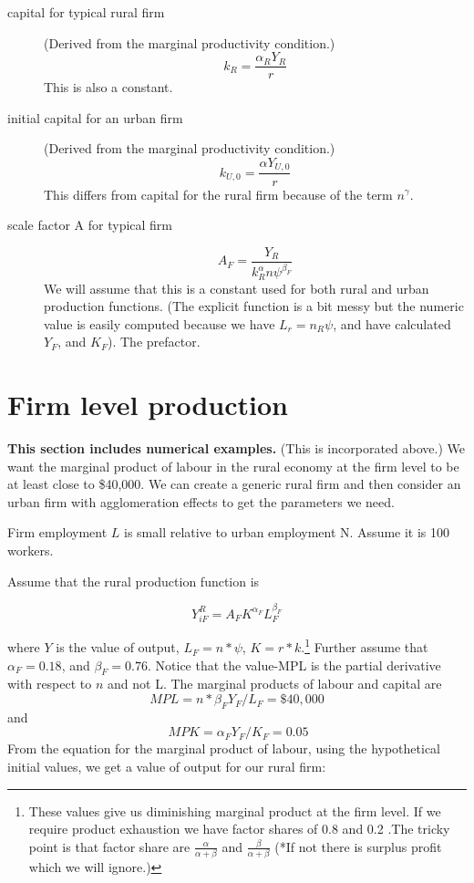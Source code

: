\begin{description}
\item[capital for typical rural firm] (Derived from the marginal productivity condition.)
\[k_R=  \frac{\alpha_R Y_R }{r}\]
This is also a constant.
 
\item[initial capital for an urban firm] (Derived from the marginal productivity condition.)
\[k_{U,0}=  \frac{\alpha Y_{U,0} }{r}\]
This differs from capital  for the rural firm because of the term $n^\gamma$. 

\item[scale factor A for typical  firm] 
\[A_F= \frac{Y_R}{k_R^{\alpha} {n\psi}^{\beta_F}}\]
We will assume that this is a constant used for both rural and urban production functions. (The explicit function is a bit  messy but the numeric value is easily computed because we have $L_r=n_R\psi$, and have calculated $Y_F$, and  $K_F$). The prefactor.

\end{description}


\section{Firm level production}  
 \textbf{This section includes numerical examples.%
 }
(This is incorporated above.) We want the marginal product of labour in the rural economy at the firm level to be at least close to \$40,000.  We can create a generic rural firm and then consider an urban firm with agglomeration effects to get the parameters we need. 

Firm employment $L$ is small relative to  urban employment {N}. Assume it is 100 workers. 

Assume that the rural production function is 

\[ Y_{iF}^R=A_{F} K^{\alpha_F} L_F^{\beta_F} \]

where $Y$ is the value of output, $L_F=n*\psi$, $K=r*k$.\footnote{These values give us diminishing marginal product at the firm level. If we require product exhaustion we have factor shares of  0.8 and 0.2 .The tricky point is that factor share are 
 $\frac{\alpha}{\alpha + \beta}$ and $\frac{\beta}{\alpha + \beta}$
(*If not there is surplus profit  which we will ignore.)}
Further assume that $\alpha_F=0.18 $,  and $\beta_F=0.76$. Notice that the value-MPL is the partial derivative with respect to $n$ and not L. 
The marginal products of labour and capital are 
\[MPL=n*\beta_F Y_F/L_F=\$40,000\] and\[\ MPK=\alpha_F Y_F/K_F =0.05\]
From the equation for the marginal product of labour, using the hypothetical initial values, we get a value of output for our rural firm:

